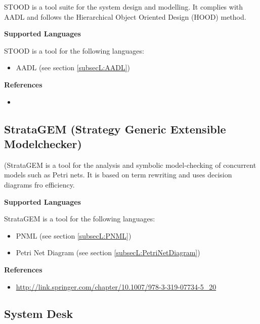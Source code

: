STOOD is a tool suite for the system design and modelling. It complies with AADL and follows the Hierarchical Object Oriented Design (HOOD) method.

\textbf{Supported Languages}

STOOD is a tool for the following languages:
\begin{itemize}
	\item AADL (see section \ref{subsecL:AADL})
\end{itemize}


\textbf{References}
\begin{itemize}
	
\item {}
\end{itemize}



\subsection{StrataGEM (Strategy Generic Extensible Modelchecker)}
\label{subsecT:StrataGEM}


(StrataGEM is a tool for the analysis and symbolic model-checking of concurrent models such as Petri nets. It is based on term rewriting and uses decision diagrams fro efficiency.

\textbf{Supported Languages}

StrataGEM is a tool for the following languages:
\begin{itemize}
	\item PNML (see section \ref{subsecL:PNML})
	\item Petri Net Diagram (see section \ref{subsecL:PetriNetDiagram})
\end{itemize}


\textbf{References}
\begin{itemize}
	
\item \url{http://link.springer.com/chapter/10.1007/978-3-319-07734-5_20}
\end{itemize}



\subsection{System Desk}
\label{subsecT:SystemDesk}


